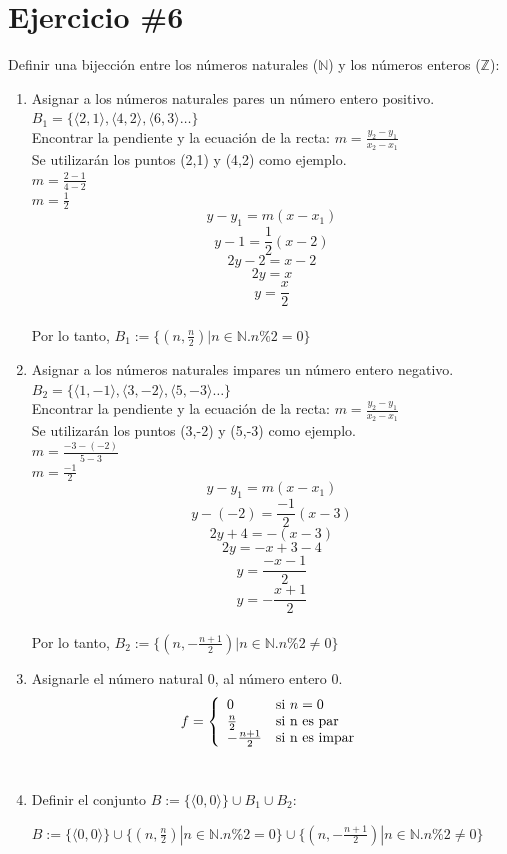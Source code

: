 \documentclass{article}
\begin{document}
\section*{Ejercicio \#6}
Definir una bijección entre los números naturales ($\mathbb{N}$) y los números enteros ($\mathbb{Z}$):\\
\begin{enumerate}
        \item Asignar a los números naturales pares un número entero positivo. $B_1=\{
        \langle 2,1 \rangle, \langle 4,2 \rangle, \langle 6, 3 \rangle\ldots \}$ \\
        Encontrar la pendiente y la ecuación de la recta:
        $m=\frac{y_2 - y_1}{x_2 - x_1}$\\
        Se utilizarán los puntos (2,1) y (4,2) como ejemplo.\\
        $m=\frac{2 - 1}{4 - 2}$\\
        $m=\frac{1}{2}$\\
        \[
y-y_1=m(x-x_1)
\]
      \[
y-1=\frac{1}{2}(x-2)
\]
\[
2y-2=x-2
\]
\[
2y=x
\]
\[
y=\frac{x}{2}
\]\\
Por lo tanto, $B_1:=\{(n,\frac{n}{2})|n\in\mathbb{N}.n\%2=0\}$\\
\item Asignar a los números naturales impares un número entero negativo. $B_2=\{
        \langle 1,-1 \rangle, \langle 3,-2 \rangle, \langle 5, -3 \rangle\ldots \}$\\
        Encontrar la pendiente y la ecuación de la recta:
        $m=\frac{y_2 - y_1}{x_2 - x_1}$\\
        Se utilizarán los puntos (3,-2) y (5,-3) como ejemplo.\\
        $m=\frac{-3 - (-2)}{5 - 3}$\\
        $m=\frac{-1}{2}$\\
        \[
y-y_1=m(x-x_1)
\]
      \[
y-(-2)=\frac{-1}{2}(x-3)
\]
\[
2y+4=-(x-3)
\]
\[
2y=-x+3-4
\]
\[
y=\frac{-x-1}{2}
\]
\[
y=-\frac{x+1}{2}
\]\\
Por lo tanto, $B_2:=\{(n,-\frac{n+1}{2})|n\in\mathbb{N}.n\%2\neq0\}$\\
\item Asignarle el número natural 0, al número entero 0.
\[
        f=\left\{
        \begin{array}{l l}
            0 & \mbox{si } n=0 \\
            \frac{n}{2} & \mbox{si n es par} \\
            -\frac{n+1}{2} & \mbox{si n es impar}\\
        \end{array}
        \right.
    \]\\
\item Definir el conjunto $B:= \{\langle 0,0\rangle \}\cup B_{1} \cup B_{2}$: \\
\begin{center}$B:= \{\langle 0,0\rangle \}\cup \{(n,\frac{n}{2})|n\in\mathbb{N}.n\%2=0\} \cup \{(n,-\frac{n+1}{2})|n\in\mathbb{N}.n\%2\neq0\}$\end{center}
\end{enumerate}
\end{document}
